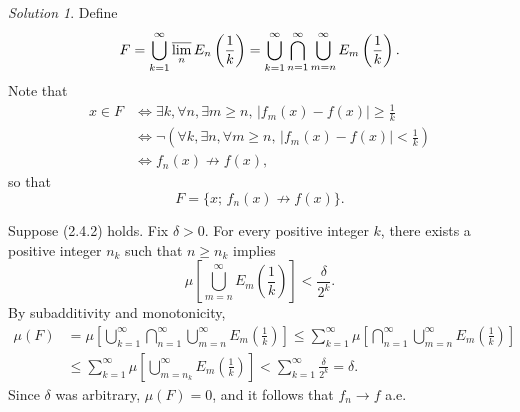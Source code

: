 \documentclass{report}
\theoremstyle{remark}
\newtheorem*{solution}{Solution}
\begin{document}
\begin{solution}
  Define
  \begin{equation*}
    F = \bigcup_{k=1}^\infty \varlimsup_n E_n \left( \frac{1}{k} \right) = \bigcup_{k=1}^\infty \bigcap_{n=1}^\infty \bigcup_{m=n}^\infty E_m \left( \frac{1}{k} \right).
  \end{equation*}
  Note that
  \begin{equation*}
    \begin{split}
      x \in F &\iff \exists k, \forall n, \exists m \ge n, \, |f_m(x) - f(x)| \ge \frac{1}{k} \\
      &\iff \neg \left( \forall k, \exists n, \forall m \ge n, \, |f_m(x) - f(x)| < \frac{1}{k} \right) \\
      &\iff f_n(x) \not\to f(x),
    \end{split}
  \end{equation*}
  so that
  \begin{equation*}
    F = \{x; \, f_n(x) \not\to f(x)\}.
  \end{equation*}

  Suppose (2.4.2) holds. Fix $\delta > 0$. For every positive integer $k$, there exists a positive integer $n_k$ such that $n \ge n_k$ implies
  \begin{equation*}
    \mu \left[ \bigcup_{m=n}^\infty E_m \left( \frac{1}{k} \right) \right] < \frac{\delta}{2^k}.
  \end{equation*}
  By subadditivity and monotonicity,
  \begin{equation*}
    \begin{split}
      \mu(F) &= \mu \left[ \bigcup_{k=1}^\infty \bigcap_{n=1}^\infty \bigcup_{m=n}^\infty E_m \left( \frac{1}{k} \right) \right] \le \sum_{k=1}^\infty \mu \left[ \bigcap_{n=1}^\infty \bigcup_{m=n}^\infty E_m \left( \frac{1}{k} \right) \right] \\
      &\le \sum_{k=1}^\infty \mu \left[ \bigcup_{m=n_k}^\infty E_m \left( \frac{1}{k} \right) \right] < \sum_{k=1}^\infty \frac{\delta}{2^k} = \delta.
    \end{split}
  \end{equation*}
  Since $\delta$ was arbitrary, $\mu(F) = 0$, and it follows that $f_n \to f$ a.e.


\end{solution}
\end{document}
